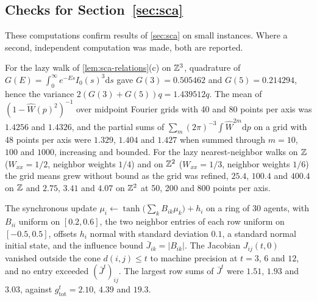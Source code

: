 \subsection{Checks for \texorpdfstring{Section~\ref{sec:sca}}{scale}}\label{chk:sca}

These computations confirm results of \cref{sec:sca} on small instances. Where a second, independent computation was made, both are reported.

\begin{numcheck}\label{chk:sca-relations}
For the lazy walk of \cref{lem:sca-relations}(c) on $\mathbb{Z}^3$, quadrature of $G(E)=\int_0^\infty e^{-Es}I_0(s)^3\mathrm ds$ gave $G(3)=0.505462$ and $G(5)=0.214294$, hence the variance $2(G(3)+G(5))q=1.439512q$. The mean of $(1-\hat W(p)^2)^{-1}$ over midpoint Fourier grids with 40 and 80 points per axis was $1.4256$ and $1.4326$, and the partial sums of $\sum_m(2\pi)^{-3}\int\hat W^{2m}\mathrm dp$ on a grid with 48 points per axis were $1.329$, $1.404$ and $1.427$ when summed through $m=10$, $100$ and $1000$, increasing and bounded. For the lazy nearest-neighbor walks on $\mathbb{Z}$ ($W_{xx}=1/2$, neighbor weights $1/4$) and on $\mathbb{Z}^2$ ($W_{xx}=1/3$, neighbor weights $1/6$) the grid means grew without bound as the grid was refined, $25.4$, $100.4$ and $400.4$ on $\mathbb{Z}$ and $2.75$, $3.41$ and $4.07$ on $\mathbb{Z}^2$ at 50, 200 and 800 points per axis.
\end{numcheck}

\begin{numcheck}\label{chk:sca-lightcone}
The synchronous update $\mu_i\leftarrow\tanh\bigl(\sum_kB_{ik}\mu_k\bigr)+h_i$ on a ring of 30 agents, with $B_{ii}$ uniform on $[0.2,0.6]$, the two neighbor entries of each row uniform on $[-0.5,0.5]$, offsets $h_i$ normal with standard deviation $0.1$, a standard normal initial state, and the influence bound $\bar J_{ik}=|B_{ik}|$. The Jacobian $J_{ij}(t,0)$ vanished outside the cone $d(i,j)\le t$ to machine precision at $t=3$, $6$ and $12$, and no entry exceeded $(\bar J^t)_{ij}$. The largest row sums of $\bar J^t$ were $1.51$, $1.93$ and $3.03$, against $g_{\mathrm{tot}}^t=2.10$, $4.39$ and $19.3$.
\end{numcheck}

